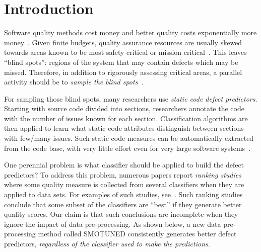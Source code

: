 \documentclass[10pt,conference]{IEEEtran}
\theoremstyle{break}
\theoremstyle{break}
\newcommand{\smb}{{\sc SMOTUNED}}
\begin{document}
\IEEEpeerreviewmaketitle


\section{Introduction}
\label{sect:intro}
Software quality methods cost money and better quality costs exponentially more money~\cite{voas95,fu2016tuning}.  
Given finite budgets, quality assurance resources are usually 
skewed towards areas known to be most safety critical or mission critical~\cite{lowryBK98}. This leaves ``blind spots'': regions of the system that may contain defects which may be missed. Therefore, in addition to rigorously assessing  critical areas, a parallel activity should be to {\em sample the blind spots}~\cite{Menzies04}. 

For sampling those blind spots, many researchers  use  {\em static code defect predictors}.
Starting with source code divided into sections, researchers annotate the code with the number of issues known for each section.
Classification algorithms are then applied to learn what static code attributes
distinguish 
between sections with few/many issues.
Such static code measures can be automatically extracted from
the code base, with very little effort even for very large software
systems~\cite{Nagappan:2005}.  


One perennial problem   is what classifier should be applied to build the defect predictors?
To address this problem, numerous papers report {\em ranking studies} where
some quality measure  is collected from  several  classifiers when they are 
 applied to data sets.
For examples of such studies,
see~\cite{lessmann2008benchmarking,hall2012systematic,elish2008predicting,menzies2010defect,gondra2008applying,radjenovic2013software,jiang2008techniques,wang2013using,mende2009revisiting,li2012sample,khoshgoftaar2010attribute,jiang2009variance,ghotra2015revisiting,jiang2008can,tantithamthavorn2016automated,fu2016tuning}.
Such ranking studies conclude that some subset of the classifiers
are  ``best'' if they generate  better quality scores.
Our claim is that such conclusions are incomplete when
they ignore the impact of  
data pre-processing. As shown below,
a new data pre-processing method called {\smb}
 consistently generates better 
defect predictors,
{\em regardless of the classifier used
to make the predictions}.  
\end{document}
